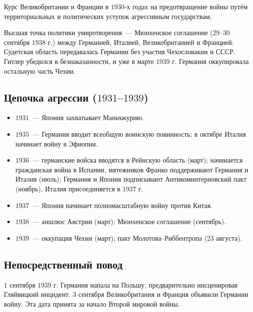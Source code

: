 \documentclass[12pt]{article}
\begin{document}
	\begin{definition}
		Курс Великобритании и Франции в $1930$-х годах на предотвращение войны путём территориальных и политических уступок агрессивным государствам.
	\end{definition}

	\begin{note}
		Высшая точка политики умиротворения~--- Мюнхенское соглашение ($29$--$30$ сентября $1938$ г.) между Германией, Италией, Великобританией и Францией: Судетская область передавалась Германии без участия Чехословакии и СССР. Гитлер убедился в безнаказанности, и уже в марте $1939$ г. Германия оккупировала остальную часть Чехии.
	\end{note}

	\subsection{Цепочка агрессии ($1931$--$1939$)}

	\begin{itemize}
		\item $1931$~--- Япония захватывает Маньчжурию.
		\item $1935$~--- Германия вводит всеобщую воинскую повинность; в октябре Италия начинает войну в Эфиопии.
		\item $1936$~--- германские войска вводятся в Рейнскую область (март); начинается гражданская война в Испании, мятежников Франко поддерживают Германия и Италия (июль); Германия и Япония подписывают Антикоминтерновский пакт (ноябрь), Италия присоединяется в $1937$ г.
		\item $1937$~--- Япония начинает полномасштабную войну против Китая.
		\item $1938$~--- аншлюс Австрии (март); Мюнхенское соглашение (сентябрь).
		\item $1939$~--- оккупация Чехии (март); пакт Молотова--Риббентропа ($23$ августа).
	\end{itemize}

	\subsection{Непосредственный повод}

	$1$ сентября $1939$ г. Германия напала на Польшу, предварительно инсценировав Гляйвицкий инцидент. $3$ сентября Великобритания и Франция объявили Германии войну. Эта дата принята за начало Второй мировой войны.
\end{document}
